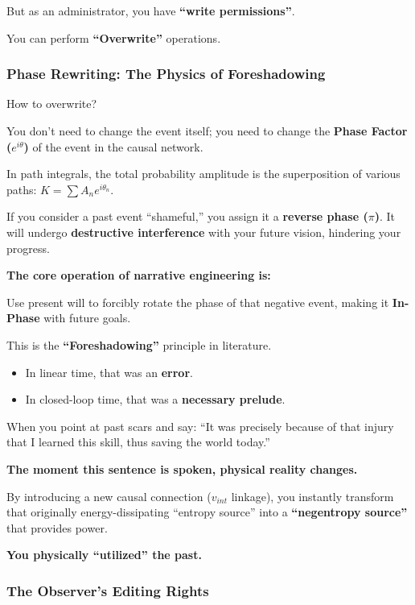 But as an administrator, you have \textbf{``write permissions''}.

You can perform \textbf{``Overwrite''} operations.

\subsubsection{Phase Rewriting: The Physics of Foreshadowing}

How to overwrite?

You don't need to change the event itself; you need to change the \textbf{Phase Factor ($e^{i\theta}$)} of the event in the causal network.

In path integrals, the total probability amplitude is the superposition of various paths: $K = \sum A_n e^{i\theta_n}$.

If you consider a past event ``shameful,'' you assign it a \textbf{reverse phase ($\pi$)}. It will undergo \textbf{destructive interference} with your future vision, hindering your progress.

\textbf{The core operation of narrative engineering is:}

Use present will to forcibly rotate the phase of that negative event, making it \textbf{In-Phase} with future goals.

This is the \textbf{``Foreshadowing''} principle in literature.

\begin{itemize}
\item In linear time, that was an \textbf{error}.

\item In closed-loop time, that was a \textbf{necessary prelude}.
\end{itemize}

When you point at past scars and say: ``It was precisely because of that injury that I learned this skill, thus saving the world today.''

\textbf{The moment this sentence is spoken, physical reality changes.}

By introducing a new causal connection ($v_{int}$ linkage), you instantly transform that originally energy-dissipating ``entropy source'' into a \textbf{``negentropy source''} that provides power.

\textbf{You physically ``utilized'' the past.}

\subsubsection{The Observer's Editing Rights}

